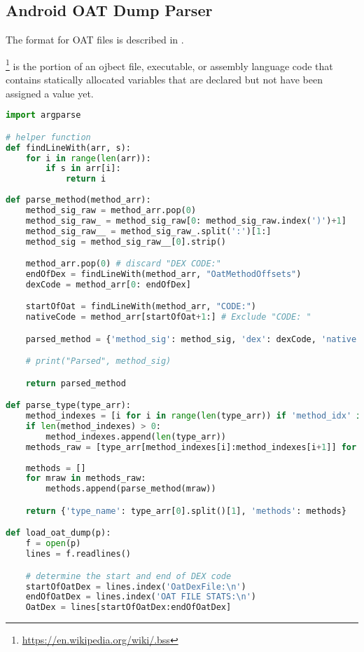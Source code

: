 \subsection{Android OAT Dump Parser}
\label{task:20231129_memdump}

The format for OAT files is described in .

\footnote{\url{https://en.wikipedia.org/wiki/.bss}} is the portion of an ojbect file, executable, or assembly language code that contains statically allocated variables that are declared but not have been assigned a value yet.

\begin{lstlisting}[language=python]
import argparse

# helper function
def findLineWith(arr, s):
    for i in range(len(arr)):
        if s in arr[i]:
            return i
        
def parse_method(method_arr):
    method_sig_raw = method_arr.pop(0)
    method_sig_raw_ = method_sig_raw[0: method_sig_raw.index(')')+1]
    method_sig_raw__ = method_sig_raw_.split(':')[1:]
    method_sig = method_sig_raw__[0].strip()

    method_arr.pop(0) # discard "DEX CODE:"
    endOfDex = findLineWith(method_arr, "OatMethodOffsets")
    dexCode = method_arr[0: endOfDex]

    startOfOat = findLineWith(method_arr, "CODE:")
    nativeCode = method_arr[startOfOat+1:] # Exclude "CODE: "

    parsed_method = {'method_sig': method_sig, 'dex': dexCode, 'native': nativeCode}

    # print("Parsed", method_sig)

    return parsed_method

def parse_type(type_arr):
    method_indexes = [i for i in range(len(type_arr)) if 'method_idx' in type_arr[i]]
    if len(method_indexes) > 0: 
        method_indexes.append(len(type_arr))
    methods_raw = [type_arr[method_indexes[i]:method_indexes[i+1]] for i in range(0, len(method_indexes)-1)]
    
    methods = []
    for mraw in methods_raw:
        methods.append(parse_method(mraw))

    return {'type_name': type_arr[0].split()[1], 'methods': methods}

def load_oat_dump(p):
    f = open(p)
    lines = f.readlines()

    # determine the start and end of DEX code
    startOfOatDex = lines.index('OatDexFile:\n')
    endOfOatDex = lines.index('OAT FILE STATS:\n')
    OatDex = lines[startOfOatDex:endOfOatDex]


\end{lstlisting}
